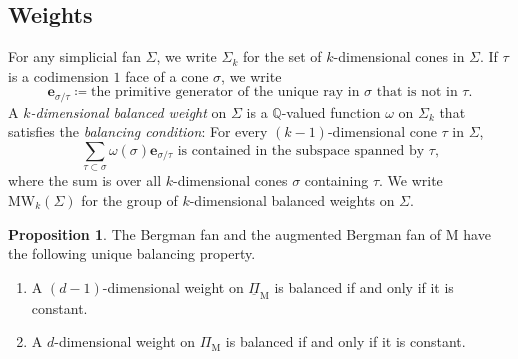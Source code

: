 \documentclass[11pt,reqno]{amsart}
\theoremstyle{definition}
\newtheorem{proposition}[theorem]{Proposition}
\theoremstyle{remark}
\renewcommand{\(}{\left(}
\renewcommand{\)}{\right)}
\newcommand{\<}{\left<}
\renewcommand{\>}{\right>}
\begin{document}
\subsection{Weights}\label{sec:weights}

For any simplicial fan $\Sigma$, we write $\Sigma_k$ for the set of $k$-dimensional cones in $\Sigma$.
If $\tau$ is a codimension $1$ face of a cone $\sigma$, we write
\[
\mathbf{e}_{\sigma/\tau}\coloneq \text{the primitive generator of the unique ray in $\sigma$ that is not in $\tau$}.
\]
A \emph{$k$-dimensional balanced weight} on $\Sigma$ is a $\mathbb{Q}$-valued function 
$\omega$ on $\Sigma_k$ that satisfies the \emph{balancing condition}: For every $(k-1)$-dimensional cone $\tau$ in $\Sigma$,
\[
\text{$\sum_{\tau \subset \sigma} \omega(\sigma) \mathbf{e}_{\sigma/\tau}$ is contained in the subspace spanned by $\tau$,}
\]
where the sum is over all $k$-dimensional cones $\sigma$ containing $\tau$.
We write $\mathrm{MW}_k(\Sigma)$ for the group of $k$-dimensional balanced weights on $\Sigma$.

\begin{proposition}\label{PropositionUniqueBalancing}
The Bergman fan and the augmented Bergman fan of $\mathrm{M}$ have the following unique balancing property.
\begin{enumerate}[(1)]\itemsep 5pt
\item A $(d-1)$-dimensional weight on $\underline{\Pi}_\mathrm{M}$ is balanced if and only if it is constant.
\item A $d$-dimensional weight on $\Pi_\mathrm{M}$ is balanced if and only if it is constant.
\end{enumerate}
\end{proposition}
\end{document}
